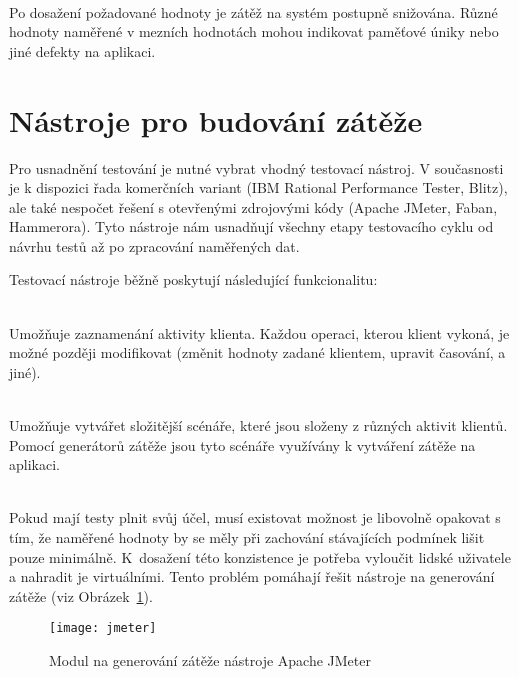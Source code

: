 \documentclass[122pt,oneside]{fithesis}
\begin{document}
\vspace{5 mm}
\\\indent Po dosažení požadované hodnoty je zátěž na systém postupně snižována. Různé hodnoty naměřené v mezních hodnotách mohou indikovat paměťové úniky nebo jiné defekty na aplikaci.

\section{Nástroje pro budování zátěže}

Pro usnadnění testování je nutné vybrat vhodný testovací nástroj. V současnosti je k dispozici řada komerčních variant (IBM Rational Performance Tester, Blitz), ale také nespočet řešení s otevřenými zdrojovými kódy (Apache JMeter, Faban, Hammerora). Tyto nástroje nám usnadňují všechny etapy testovacího cyklu od návrhu testů až po zpracování naměřených dat. 

Testovací nástroje běžně poskytují následující funkcionalitu:

\vspace{5 mm}
\\\indent Umožňuje zaznamenání aktivity klienta. Každou operaci, kterou klient vykoná, je možné později modifikovat (změnit hodnoty zadané klientem, upravit časování, a jiné).

\vspace{5 mm}
\\\indent Umožňuje vytvářet složitější scénáře, které jsou složeny z různých aktivit klientů. Pomocí generátorů zátěže jsou tyto scénáře využívány k vytváření zátěže na aplikaci.

\vspace{5 mm}
\\\indent Pokud mají testy plnit svůj účel, musí existovat možnost je libovolně opakovat s tím, že naměřené hodnoty by se měly při zachování stávajících podmínek lišit pouze minimálně. K~dosažení této konzistence je potřeba vyloučit lidské uživatele a nahradit je virtuálními. Tento problém pomáhají řešit nástroje na generování zátěže (viz Obrázek~\ref{img:jmeter}).

\begin{figure}[!ht]
\centering
\texttt{[image: jmeter]}
\caption{Modul na generování zátěže nástroje Apache JMeter}
\label{img:jmeter}
\end{figure}
\end{document}
